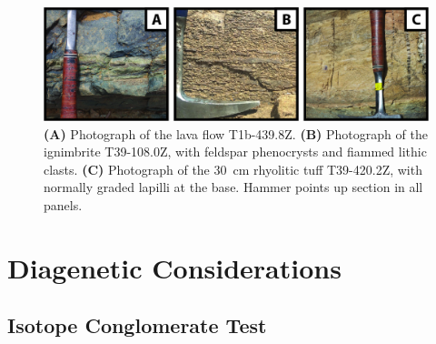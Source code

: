 \begin{figure}[h!]
\begin{center}
	\includegraphics[width=\textwidth]{figures/Tambien/geochronology-photos.jpg}
	\caption[Field photographs of geochronology samples.]{\textbf{(A)} Photograph of the lava flow T1b-439.8Z. \textbf{(B)} Photograph of the ignimbrite T39-108.0Z, with feldspar phenocrysts and fiammed lithic clasts. \textbf{(C)} Photograph of the 30~cm rhyolitic tuff T39-420.2Z, with normally graded lapilli at the base. Hammer points up section in all panels.}
	\label{fig:geochronology-photos}
\end{center}
\end{figure}

\clearpage

\section{Diagenetic Considerations}

\subsection{Isotope Conglomerate Test}

